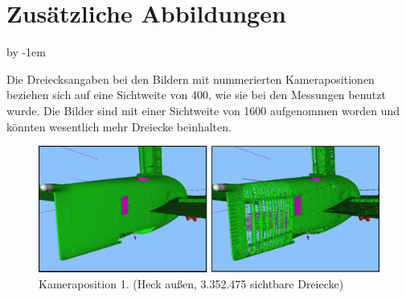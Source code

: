 %
%
%
%
%
%
%
%
%

\chapter{Zusätzliche Abbildungen}
\advance\abovecaptionskip by -1em

\label{chap:add_fig}
Die Dreiecksangaben bei den Bildern mit nummerierten Kamerapositionen beziehen sich auf eine Sichtweite von 400, wie sie bei den Messungen benutzt wurde. Die Bilder sind mit einer Sichtweite von 1600 aufgenommen worden und könnten wesentlich mehr Dreiecke beinhalten.\bigskip


\begin{figure}[h]
 \centering
\includegraphics[width=\hsize]{images/pos1.pdf}
\caption[Kameraposition 1.]{\label{fig:eval:pos1}Kameraposition 1. (Heck außen, 3.352.475 sichtbare Dreiecke)}
\end{figure}

